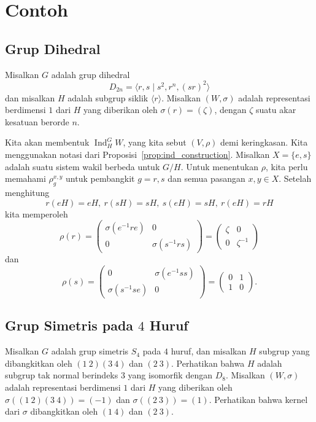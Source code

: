 \documentclass[12pt]{article}
\theoremstyle{plain}
\theoremstyle{definition}
\theoremstyle{remark}
\numberwithin{equation}{section}
\begin{document}
\section{Contoh}

\subsection{Grup Dihedral}

Misalkan $G$ adalah grup dihedral
\[
D_{2n} = \langle r,s \mid s^2, r^n, (sr)^2 \rangle
\]
dan misalkan $H$ adalah subgrup siklik $\langle r \rangle$.
Misalkan $(W,\sigma)$ adalah representasi berdimensi $1$ dari $H$
yang diberikan oleh $\sigma(r)=(\zeta)$, dengan $\zeta$ suatu akar kesatuan berorde $n$.

Kita akan membentuk $\operatorname{Ind}^G_H W$, yang kita sebut $(V,\rho)$
demi keringkasan.
Kita menggunakan notasi dari Proposisi~\ref{prop:ind_construction}.
Misalkan $X = \{e, s \}$ adalah suatu sistem wakil berbeda untuk $G/H$.
Untuk menentukan $\rho$, kita perlu memahami $\rho_g^{x,y}$
untuk pembangkit $g=r,s$ dan semua pasangan $x,y \in X$.
Setelah menghitung
\[
r(eH)=eH,\ r(sH)=sH,\ s(eH)=sH,\ r(eH)=rH 
\]
kita memperoleh
\[
\rho(r)=
\begin{pmatrix} \sigma(e^{-1}re) & 0 \\ 0 & \sigma(s^{-1}rs) \end{pmatrix}
=\begin{pmatrix} \zeta & 0 \\ 0 & \zeta^{-1} \end{pmatrix}
\]
dan
\[
\rho(s)=
\begin{pmatrix} 0 & \sigma(e^{-1}ss) \\ \sigma(s^{-1}se) & 0 \end{pmatrix}
=\begin{pmatrix} 0 & 1 \\ 1 & 0 \end{pmatrix}.
\]

\subsection{Grup Simetris pada $4$ Huruf}

Misalkan $G$ adalah grup simetris $S_4$ pada $4$ huruf,
dan misalkan $H$ subgrup yang dibangkitkan oleh $(1\ 2)(3\ 4)$
dan $(2\ 3)$.
Perhatikan bahwa $H$ adalah subgrup tak normal berindeks $3$
yang isomorfik dengan $D_8$.
Misalkan $(W,\sigma)$ adalah representasi berdimensi $1$ dari $H$
yang diberikan oleh $\sigma((1\ 2)(3\ 4))=(-1)$ dan $\sigma((2\ 3))=(1)$.
Perhatikan bahwa kernel dari $\sigma$ dibangkitkan oleh $(1\ 4)$ dan $(2\ 3)$.
\end{document}
